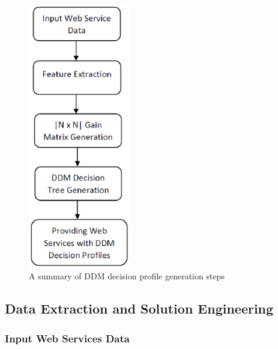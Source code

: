 \begin{figure}%
\centerline{\includegraphics[width=1.75in]{figures/steps.eps}}
\caption{A summary of DDM decision profile generation steps}
\label{fig_steps}
\end{figure}

\subsection{Data Extraction and Solution Engineering}\label{ss:learningdata}

\subsubsection{Input Web Services Data}\label{sss:webservices}

